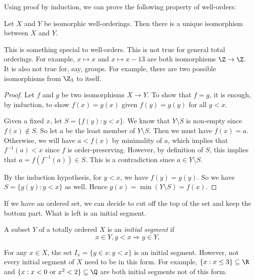 \documentclass[a4paper]{article}
\begin{document}
Using proof by induction, we can prove the following property of well-orders:
\begin{prop}
  Let $X$ and $Y$ be isomorphic well-orderings. Then there is a unique isomorphism between $X$ and $Y$.
\end{prop}
This is something special to well-orders. This is not true for general total orderings. For example, $x\mapsto x$ and $x\mapsto x - 13$ are both isomorphisms $\Z\to \Z$. It is also not true for, say, groups. For example, there are two possible isomorphisms from $\Z_3$ to itself.

\begin{proof}
  Let $f$ and $g$ be two isomorphisms $X\to Y$. To show that $f = g$, it is enough, by induction, to show $f(x) = g(x)$ given $f(y) = g(y)$ for all $y < x$.

  Given a fixed $x$, let $S = \{f(y): y < x\}$. We know that $Y\setminus S$ is non-empty since $f(x) \not\in S$. So let $a$ be the least member of $Y\setminus S$. Then we must have $f(x) = a$. Otherwise, we will have $a < f(x)$ by minimality of $a$, which implies that $f^{-1}(a) < x$ since $f$ is order-preserving. However, by definition of $S$, this implies that $a = f(f^{-1}(a)) \in S$. This is a contradiction since $a \in Y\setminus S$.

  By the induction hypothesis, for $y < x$, we have $f(y) = g(y)$. So we have $S = \{g(y): y < x\}$ as well. Hence $g(x) = \min(Y\setminus S) = f(x)$.
\end{proof}

If we have an ordered set, we can decide to cut off the top of the set and keep the bottom part. What is left is an initial segment.
\begin{defi}
  A subset $Y$ of a totally ordered $X$ is an \emph{initial segment} if
  \[
    x\in Y, y< x \Rightarrow  y\in Y,
  \]
  \begin{center}
  \end{center}
\end{defi}

\begin{eg}
  For any $x\in X$, the set $I_x = \{y\in x: y < x\}$ is an initial segment. However, not every initial segment of $X$ need to be in this form. For example, $\{x: x\leq 3\}\subseteq \R$ and $\{x: x < 0\text{ or }x^2 < 2\}\subseteq \Q$ are both initial segments not of this form.
\end{eg}
\end{document}
